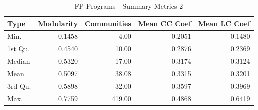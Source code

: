 \documentclass[12pt, a4paper]{article}
\begin{document}
\begin{longtable}[H]{l r r r r}
    \caption{FP Programs - Summary Metrics 2}\label{table:fp_sum_metrics_2}\\
        Type & Modularity & Communities & Mean CC Coef & Mean LC Coef \\
        \hline            
        \endhead
        Min.    & 0.1458 &   4.00 & 0.2051 & 0.1480  \\
        1st Qu. & 0.4540 &  10.00 & 0.2876 & 0.2369  \\
        Median  & 0.5320 &  17.00 & 0.3174 & 0.3124  \\
        Mean    & 0.5097 &  38.08 & 0.3315 & 0.3201  \\
        3rd Qu. & 0.5898 &  32.00 & 0.3597 & 0.3969  \\
        Max.    & 0.7759 & 419.00 & 0.4868 & 0.6419
\end{longtable}
\end{document}
